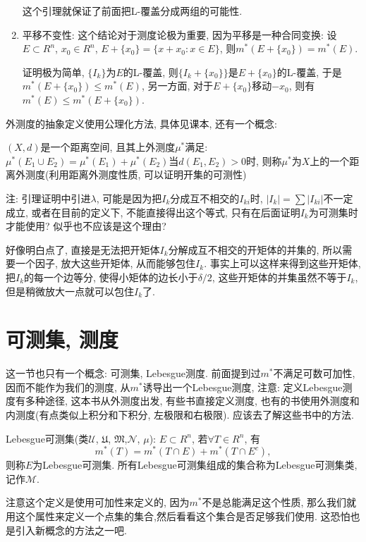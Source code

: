 \documentclass[12pt,a4paper,openany]{book}
\begin{document}
\begin{enumerate}
这个引理就保证了前面把L-覆盖分成两组的可能性.

\item 平移不变性: 这个结论对于测度论极为重要, 因为平移是一种合同变换: 设$E \subset R^n$, $x_0 \in R^n$, $E+\{x_0\} = \{x + x_0 : x \in E\}$, 则$m^*(E + \{x_0\}) = m^*(E)$.

证明极为简单, $\{I_k\}$为$E$的L-覆盖, 则$\{I_k + \{x_0\}\}$是$E + \{x_0\}$的L-覆盖, 于是$m^*(E + \{x_0\}) \le m^*(E)$, 另一方面, 对于$E + \{x_0\}$移动$-x_0$, 则有$m^*(E) \le  m^*(E + \{x_0\})$.
\end{enumerate}

外测度的抽象定义使用公理化方法, 具体见课本, 还有一个概念:

$(X, d)$是一个距离空间, 且其上外测度$\mu^*$满足: $\mu^*(E_1 \cup E_2) = \mu^*(E_1) + \mu^*(E_2)$当$d(E_1, E_2) > 0$时, 则称$\mu^*$为$X$上的一个距离外测度(利用距离外测度性质, 可以证明开集的可测性)

注: 引理证明中引进$\lambda$, 可能是因为把$I_k$分成互不相交的$I_{ki}$时, $|I_k| = \sum{|I_{ki}|}$不一定成立, 或者在目前的定义下, 不能直接得出这个等式, 只有在后面证明$I_k$为可测集时才能使用? 似乎也不应该是这个理由?

好像明白点了, 直接是无法把开矩体$I_k$分解成互不相交的开矩体的并集的, 所以需要一个因子, 放大这些开矩体, 从而能够包住$I_k$. 事实上可以这样来得到这些开矩体, 把$I_k$的每一个边等分, 使得小矩体的边长小于$\delta/2$, 这些开矩体的并集虽然不等于$I_k$, 但是稍微放大一点就可以包住$I_k$了.

\section{可测集, 测度}
这一节也只有一个概念: 可测集, Lebesgue测度. 前面提到过$m^*$不满足可数可加性, 因而不能作为我们的测度, 从$m^*$诱导出一个Lebesgue测度, 注意: 定义Lebesgue测度有多种途径, 这本书从外测度出发, 有些书直接定义测度, 也有的书使用外测度和内测度(有点类似上积分和下积分, 左极限和右极限). 应该去了解这些书中的方法.

Lebesgue可测集(类$\mathcal{U}$, $\mathfrak{U}$, $\mathfrak{M}$,$\mathcal{N}$, $\mathcal{\mu}$): $E \subset R^n$, 若$\forall T \in R^n$, 有
\[
m^*(T) = m^*(T \cap E) + m^*(T \cap E^c),
\]
则称$E$为Lebesgue可测集. 所有Lebesgue可测集组成的集合称为Lebesgue可测集类, 记作$\mathcal{M}$.

注意这个定义是使用可加性来定义的, 因为$m^*$不是总能满足这个性质, 那么我们就用这个属性来定义一个点集的集合,然后看看这个集合是否足够我们使用. 这恐怕也是引入新概念的方法之一吧.
\end{document}
